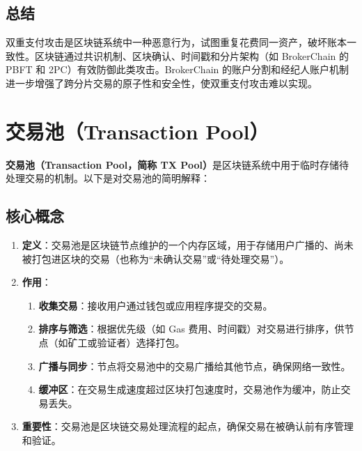 \documentclass[12pt]{ctexart}
\begin{document}
\subsection{总结}
双重支付攻击是区块链系统中一种恶意行为，试图重复花费同一资产，破坏账本一致性。区块链通过共识机制、区块确认、时间戳和分片架构（如 BrokerChain 的 PBFT 和 2PC）有效防御此类攻击。BrokerChain 的账户分割和经纪人账户机制进一步增强了跨分片交易的原子性和安全性，使双重支付攻击难以实现。

\newpage

\section{交易池（Transaction Pool）}
\textbf{交易池（Transaction Pool，简称 TX Pool）}是区块链系统中用于临时存储待处理交易的机制。以下是对交易池的简明解释：

\subsection{核心概念}
\begin{enumerate}
    \item \textbf{定义}：交易池是区块链节点维护的一个内存区域，用于存储用户广播的、尚未被打包进区块的交易（也称为“未确认交易”或“待处理交易”）。
    \item \textbf{作用}：
        \begin{enumerate}
            \item \textbf{收集交易}：接收用户通过钱包或应用程序提交的交易。
            \item \textbf{排序与筛选}：根据优先级（如 Gas 费用、时间戳）对交易进行排序，供节点（如矿工或验证者）选择打包。
            \item \textbf{广播与同步}：节点将交易池中的交易广播给其他节点，确保网络一致性。
            \item \textbf{缓冲区}：在交易生成速度超过区块打包速度时，交易池作为缓冲，防止交易丢失。
        \end{enumerate}
    \item \textbf{重要性}：交易池是区块链交易处理流程的起点，确保交易在被确认前有序管理和验证。
\end{enumerate}
\end{document}
